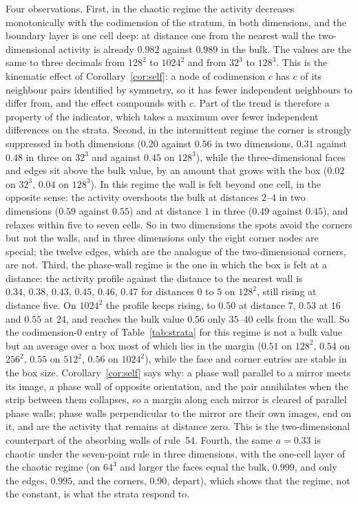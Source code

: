 \documentclass[11pt,a4paper]{article}
\theoremstyle{definition}
\theoremstyle{remark}
\begin{document}
Four observations. First, in the chaotic regime the activity decreases
monotonically with the codimension of the stratum, in both dimensions,
and the boundary layer is one cell deep: at distance one from the
nearest wall the two-dimensional activity is already $0.982$ against
$0.989$ in the bulk. The values are the same to three decimals from
$128^2$ to $1024^2$ and from $32^3$ to $128^3$. This is the kinematic effect of
Corollary~\ref{cor:self}: a node of codimension $c$ has $c$ of its
neighbour pairs identified by symmetry, so it has fewer independent
neighbours to differ from, and the effect compounds with $c$. Part of
the trend is therefore a property of the indicator, which takes a
maximum over fewer independent differences on the strata. Second, in the
intermittent regime the corner is strongly suppressed in both
dimensions ($0.20$ against $0.56$ in two dimensions, $0.31$ against
$0.48$ in three on $32^3$ and against $0.45$ on $128^3$), while the
three-dimensional faces and edges sit above the bulk value, by an
amount that grows with the box ($0.02$ on $32^3$, $0.04$ on $128^3$).
In this regime the wall is felt beyond one cell, in the opposite sense:
the activity overshoots the bulk at distances $2$--$4$ in two dimensions
($0.59$ against $0.55$) and at distance $1$ in three ($0.49$ against
$0.45$), and relaxes within five to seven cells. So in two dimensions the spots avoid the
corners but not the walls, and in three dimensions only the eight corner
nodes are special; the twelve edges, which are the analogue of the
two-dimensional corners, are not. Third, the phase-wall regime is the
one in which the box is felt at a distance: the activity profile
against the distance to the nearest wall is
$0.34,\,0.38,\,0.43,\,0.45,\,0.46,\,0.47$ for distances $0$ to $5$ on
$128^2$, still rising at distance five. On $1024^2$ the profile keeps
rising, to $0.50$ at distance $7$, $0.53$ at $16$ and $0.55$ at $24$, and
reaches the bulk value $0.56$ only $35$--$40$ cells from the wall. So the
codimension-$0$ entry of Table~\ref{tab:strata} for this regime is not a
bulk value but an average over a box most of which lies in the margin
($0.51$ on $128^2$, $0.54$ on $256^2$, $0.55$ on $512^2$, $0.56$ on
$1024^2$), while the face and corner entries are stable in the box size.
Corollary~\ref{cor:self} says why: a phase wall parallel to a mirror
meets its image, a phase wall of opposite orientation, and the pair
annihilates when the strip between them collapses, so a margin along
each mirror is cleared of parallel phase walls; phase walls
perpendicular to the mirror are their own images, end on it, and are
the activity that remains at distance zero. This is the two-dimensional
counterpart of the absorbing walls of rule~54. Fourth, the same
$a=0.33$ is chaotic under the seven-point rule in three dimensions, with
the one-cell layer of the chaotic regime (on $64^3$ and larger the
faces equal the bulk, $0.999$, and only the edges, $0.995$, and the
corners, $0.90$, depart), which shows that the regime, not the
constant, is what the strata respond to.
\end{document}
